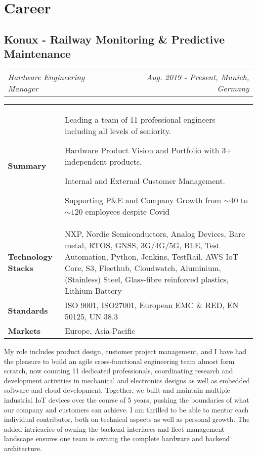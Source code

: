 \documentclass[10pt,a4paper]{moderncv}
\newcommand*{\experienceentry}[5][5mm]{
    \subsection{#2}
    \begin{tabularx}{\textwidth}{LR}
        {\itshape #3} & {\itshape #4, #5}
    \end{tabularx}
    \par\addvspace{#1}
}
\begin{document}
\section{Career}

\experienceentry{Konux - Railway Monitoring \& Predictive Maintenance}{Hardware Engineering Manager}{Aug. 2019 - Present}{Munich, Germany}

    \begin{tabularx}{\textwidth}{>{\bfseries}l@{\hskip 3.5mm}L}
        Summary & Leading a team of 11 professional engineers including all levels of seniority.\par Hardware Product Vision and Portfolio with 3+ independent products.\par Internal and External Customer Management.\par Supporting P\&E and Company Growth from $\sim 40$ to $\sim 120$ employees despite Covid\\
        Technology Stacks & NXP, Nordic Semiconductors, Analog Devices, Bare metal, RTOS, GNSS, 3G/4G/5G, BLE, Test Automation, Python, Jenkins, TestRail, AWS IoT Core, S3, Fleethub, Cloudwatch, Aluminium, (Stainless) Steel, Glass-fibre reinforced plastics, Lithium Battery\\
        Standards & ISO 9001, ISO27001, European EMC \& RED, EN 50125, UN 38.3\\
        Markets & Europe, Asia-Pacific\\
    \end{tabularx}

    \vspace{5mm}

    My role includes product design, customer project management, and I have had the pleasure to build an agile cross-functional engineering team almost form scratch, now counting 11 dedicated professionals, coordinating research and development activities in mechanical and electronics designs as well as embedded software and cloud development. Together, we built and maintain multiple industrial IoT devices over the course of 5 years, pushing the boundaries of what our company and customers can achieve. I am thrilled to be able to mentor each individual contributor, both on technical aspects as well as personal growth. The added intricacies of owning the backend interfaces and fleet management landscape ensures one team is owning the complete hardware and backend architecture.

\vspace{5mm}
\end{document}
